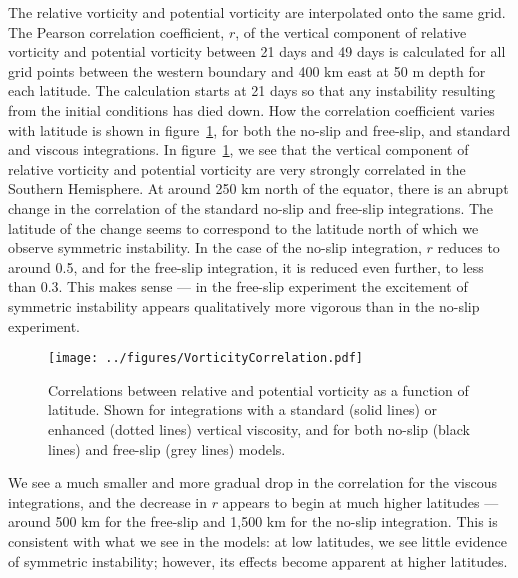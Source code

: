The relative vorticity and potential vorticity are interpolated onto the same grid. The Pearson correlation coefficient, $r$, of the vertical component of relative vorticity and potential vorticity between 21 days and 49 days is calculated for all grid points between the western boundary and 400 km east at 50 m depth for each latitude. The calculation starts at 21 days so that any instability resulting from the initial conditions has died down. How the correlation coefficient varies with latitude is shown in figure~\ref{fig:VorticityCorrelations}, for both the no-slip and free-slip, and standard and viscous integrations.
In figure~\ref{fig:VorticityCorrelations}, we see that the vertical component of relative vorticity and potential vorticity are very strongly correlated in the Southern Hemisphere. At around 250 km north of the equator, there is an abrupt change in the correlation of the standard no-slip and free-slip integrations. The latitude of the change seems to correspond to the latitude north of which we observe symmetric instability. In the case of the no-slip integration, $r$ reduces to around 0.5, and for the free-slip integration, it is reduced even further, to less than 0.3. This makes sense --- in the free-slip experiment the excitement of symmetric instability appears qualitatively more vigorous than in the no-slip experiment.

\begin{figure} 
    \centering
    \texttt{[image: ../figures/VorticityCorrelation.pdf]}
    \caption{Correlations between relative and potential vorticity as a function of latitude. Shown for integrations with a standard (solid lines) or enhanced (dotted lines) vertical viscosity, and for both no-slip (black lines) and free-slip (grey lines) models.}
    \label{fig:VorticityCorrelations}
\end{figure}

We see a much smaller and more gradual drop in the correlation for the viscous integrations, and the decrease in $r$ appears to begin at much higher latitudes --- around 500 km for the free-slip and 1,500 km for the no-slip integration. This is consistent with what we see in the models: at low latitudes, we see little evidence of symmetric instability; however, its effects become apparent at higher latitudes.


